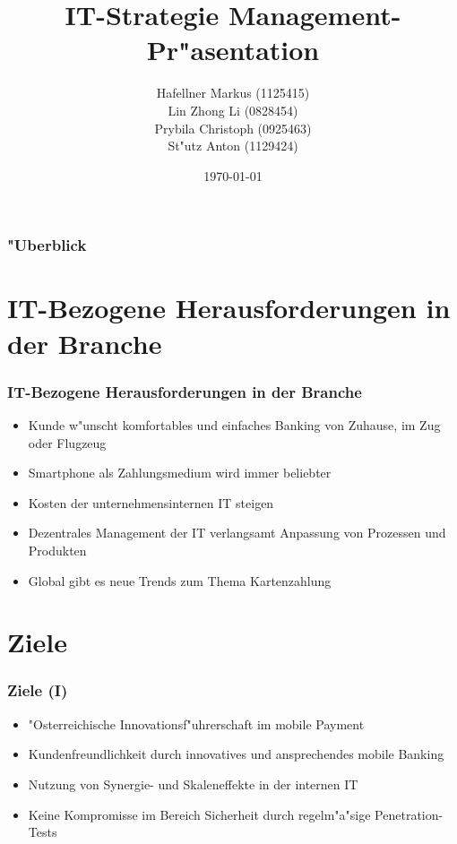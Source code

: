 \documentclass{beamer}
\title{IT-Strategie Management-Pr"asentation}
\author{ Hafellner Markus (1125415)\\
 Lin Zhong Li (0828454)\\
 Prybila Christoph (0925463)\\
 St"utz Anton (1129424)\\
}
\date{\today}
\begin{document}
\maketitle


\begin{frame}[plain]

  \frametitle{"Uberblick}
  
	\tableofcontents
\end{frame}

\section{IT-Bezogene Herausforderungen in der Branche}
\begin{frame}[plain]

  \frametitle{IT-Bezogene Herausforderungen in der Branche}
  \begin{itemize}

	\item Kunde w"unscht komfortables und einfaches Banking von Zuhause, im Zug oder Flugzeug\vspace{2mm}
	\item Smartphone als Zahlungsmedium wird immer beliebter\vspace{2mm}
	\item Kosten der unternehmensinternen IT steigen\vspace{2mm}
	\item Dezentrales Management der IT verlangsamt Anpassung von Prozessen und Produkten\vspace{2mm}
	\item Global gibt es neue Trends zum Thema Kartenzahlung

  \end{itemize}
\end{frame}

\section{Ziele}
\begin{frame}[plain]

  \frametitle{Ziele (I)}
  \begin{itemize}

	\item "Osterreichische Innovationsf"uhrerschaft im mobile Payment\vspace{2mm}
	\item Kundenfreundlichkeit durch innovatives und ansprechendes mobile Banking\vspace{2mm}
	\item Nutzung von Synergie- und Skaleneffekte in der internen IT\vspace{2mm}
	\item Keine Kompromisse im Bereich Sicherheit durch regelm"a"sige Penetration-Tests

  \end{itemize}
\end{frame}
\end{document}
